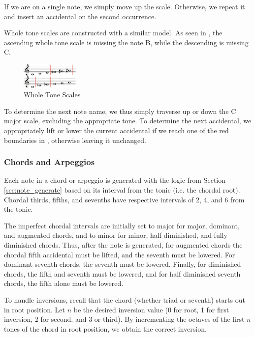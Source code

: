 \documentclass{article}
\begin{document}
If we are on a single note, we simply move up the scale. Otherwise, we repeat it and insert an accidental on the second occurrence.

Whole tone scales are constructed with a similar model. As seen in , the ascending whole tone scale is missing the note B, while the descending is missing C.

\vspace{-2mm}
\begin{figure}[h!]
\centering
\includegraphics[width=0.25\textwidth]{images/whole_tone}
\caption{Whole Tone Scales}
\label{whole_tone}
\vspace{-3mm}
\end{figure}

To determine the next note name, we thus simply traverse up or down the C major scale, excluding the appropriate tone. To determine the next accidental, we appropriately lift or lower the current accidental if we reach one of the red boundaries in , otherwise leaving it unchanged.

\subsubsection{Chords and Arpeggios}
\label{sec:chord_expansion}
Each note in a chord or arpeggio is generated with the logic from Section \ref{sec:note_generate} based on its interval from the tonic (i.e. the chordal root). Chordal thirds, fifths, and sevenths have respective intervals of 2, 4, and 6 from the tonic.

The imperfect chordal intervals are initially set to major for major, dominant, and augmented chords, and to minor for minor, half diminished, and fully diminished chords. Thus, after the note is generated, for augmented chords the chordal fifth accidental must be lifted, and the seventh must be lowered. For dominant seventh chords, the seventh must be lowered. Finally, for diminished chords, the fifth and seventh must be lowered, and for half diminished seventh chords, the fifth alone must be lowered.

To handle inversions, recall that the chord (whether triad or seventh) starts out in root position. Let $n$ be the desired inversion value (0 for root, 1 for first inversion, 2 for second, and 3 or third). By incrementing the octaves of the first $n$ tones of the chord in root position, we obtain the correct inversion.
\end{document}
